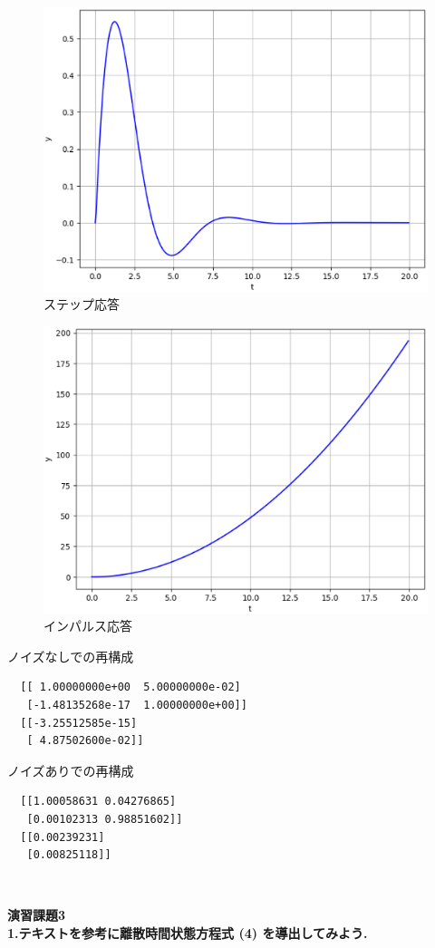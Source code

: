 \documentclass[a4paper,10.5pt]{ltjsarticle}
\begin{document}
\begin{figure}[h]
  \centering
  \includegraphics[scale=0.5]{figure3.eps}
  \caption{ステップ応答}
\end{figure}
\clearpage
\begin{figure}[h]
  \centering
  \includegraphics[scale=0.5]{figure4.eps}
  \caption{インパルス応答}
\end{figure}

\centerline{ノイズなしでの再構成}
\begin{lstlisting}
  [[ 1.00000000e+00  5.00000000e-02]
   [-1.48135268e-17  1.00000000e+00]]
  [[-3.25512585e-15]
   [ 4.87502600e-02]]
\end{lstlisting}

\centerline{ノイズありでの再構成}
\begin{lstlisting}
  [[1.00058631 0.04276865]
   [0.00102313 0.98851602]]
  [[0.00239231]
   [0.00825118]]
\end{lstlisting}
\centerline{　}
{\Large \bfseries 演習課題3}\\
{\large \bfseries 1.テキストを参考に離散時間状態方程式 (4) を導出してみよう.}\\
\end{document}
